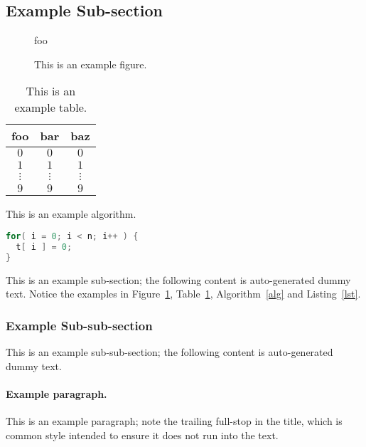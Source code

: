 \documentclass[ %
                    author={Luke Murray},
                supervisor={Dr. Simon Hollis},
                     title={Shadow Peer-to-Peer Networks},
                  subtitle={},
                    degree={MEng},
                      year={2013} ]{thesis}
\begin{document}
\subsection{Example Sub-section}

\begin{figure}[t]
\centering
foo
\caption{This is an example figure.}
\label{fig}
\end{figure}

\begin{table}[t]
\centering
\begin{tabular}{|cc|c|}
\hline
foo      & bar      & baz      \\
\hline
$0     $ & $0     $ & $0     $ \\
$1     $ & $1     $ & $1     $ \\
$\vdots$ & $\vdots$ & $\vdots$ \\
$9     $ & $9     $ & $9     $ \\
\hline
\end{tabular}
\caption{This is an example table.}
\label{tab}
\end{table}

\begin{algorithm}[t]
\caption{This is an example algorithm.}
\label{alg}
\end{algorithm}

\begin{lstlisting}[float={t},caption={This is an example listing.},label={lst},language=C]
for( i = 0; i < n; i++ ) {
  t[ i ] = 0;
}
\end{lstlisting}

This is an example sub-section;
the following content is auto-generated dummy text.
Notice the examples in Figure~\ref{fig}, Table~\ref{tab}, Algorithm~\ref{alg}
and Listing~\ref{lst}.
\lipsum

\subsubsection{Example Sub-sub-section}

This is an example sub-sub-section;
the following content is auto-generated dummy text.
\lipsum

\paragraph{Example paragraph.}

This is an example paragraph; note the trailing full-stop in the title,
which is common style intended to ensure it does not run into the text.
\end{document}
